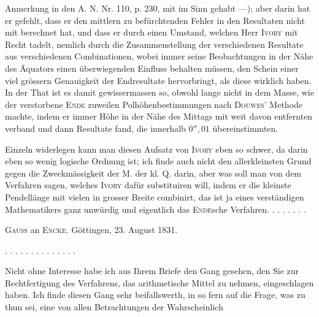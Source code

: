 Anmerkung in den A. N. Nr. 110, p. 230, mit im Sinn gehabt —); aber darin hat er gefehlt, dass er den mittlern zu befürchtenden Fehler in den Resultaten nicht mit berechnet hat, und dass er durch einen Umstand, welchen Herr \textsc{Ivory} mit Recht tadelt, nemlich durch die Zusammenstellung der verschiedenen Resultate aus verschiedenen Combinationen, wobei immer seine Beobachtungen in der Nähe des Äquators einen überwiegenden Einfluss behalten müssen, den Schein einer viel grössern Genauigkeit der Endresultate hervorbringt, als diese wirklich haben. In der That ist es damit gewissermassen so, obwohl lange nicht in dem Masse, wie der verstorbene \textsc{Ende} zuweilen Polhöhenbestimmungen nach \textsc{Douwes}’ Methode machte, indem er immer  Höhe in der Nähe des Mittags mit  weit davon entfernten verband und dann Resultate fand, die innerhalb $0'',01$ übereinstimmten.

Einzeln widerlegen kann man diesen Aufsatz von \textsc{Ivory} eben so schwer, da darin eben so wenig logische Ordnung ist; ich finde auch nicht den allerkleinsten Grund gegen die Zweckmässigkeit der M. der kl. Q. darin, aber was soll man von dem Verfahren sagen, welches \textsc{Ivory} dafür substituiren will, indem er die kleinste Pendellänge mit vielen in grosser Breite combinirt, das ist ja eines verständigen Mathematikers ganz unwürdig und eigentlich das \textsc{Ende}sche Verfahren. . . . . . . .

\begin{center}\textsc{Gauss} an \textsc{Encke}. Göttingen, 23. August 1831.\end{center}

. . . . . . . . . . . . . .

Nicht ohne Interesse habe ich aus Ihrem Briefe den Gang gesehen, den Sie zur Rechtfertigung des Verfahrens, das arithmetische Mittel zu nehmen, eingeschlagen haben. Ich finde diesen Gang sehr beifallswerth, in so fern auf die Frage, was zu thun sei, eine von allen Betrachtungen der Wahrscheinlich%
